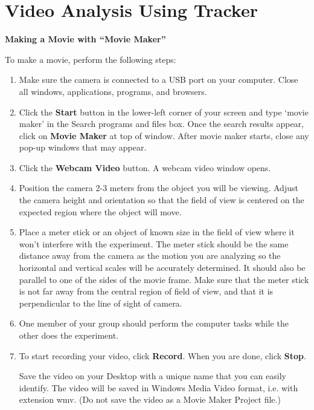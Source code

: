 
\section{Video Analysis Using Tracker}

\textbf{Making a Movie with ``Movie Maker''} 

To make a movie, perform the following steps:

\begin{enumerate}

\item Make sure the camera is connected to a USB port on your computer. 
Close all windows, applications, programs, and browsers.

\item Click the {\bf Start} button in the lower-left corner of your screen and 
type `movie maker' in the Search programs and files box. 
Once the search results appear, click on {\bf Movie Maker} at top of window.
After movie maker starts, close any pop-up windows that may appear.

\item Click the {\bf Webcam Video} button. 
A webcam video window opens. 

\item Position the camera 2-3 meters from the object you will be viewing. 
Adjust the camera height and orientation so that the field of view is 
centered on the expected region where the object will move. 

\item Place a meter stick or an object of known size in the field of view where 
it won't interfere with the experiment. 
The meter stick should be the same distance away from the camera as the motion 
you are analyzing so the horizontal and vertical scales will be accurately determined. 
It should also be parallel to one of the sides of the movie frame. 
Make sure that the meter stick is not far away from the central region of field of view, and that it is perpendicular to the line of sight of camera.

\item One member of your group should perform the computer tasks while the other does the experiment.

\item To start recording your video, click {\bf Record}. When you are done, click {\bf Stop}. 

Save the video on your Desktop with a unique name that you can easily identify.
 The video will be saved in Windows Media Video format, i.e. with extension wmv. (Do not save the video as a Movie Maker Project file.)

\end{enumerate}

